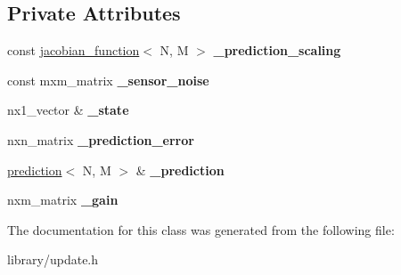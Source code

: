 \subsection*{Private Attributes}
\begin{DoxyCompactItemize}
\item 
\mbox{\label{classkafi_1_1update_a0f6b23c8db93eaabebb57f04261b558b}} 
const \hyperlink{classkafi_1_1jacobian__function}{jacobian\+\_\+function}$<$ N, M $>$ {\bfseries \+\_\+prediction\+\_\+scaling}
\item 
\mbox{\label{classkafi_1_1update_a5f1400abcbc39bbe79da665be423da8d}} 
const mxm\+\_\+matrix {\bfseries \+\_\+sensor\+\_\+noise}
\item 
\mbox{\label{classkafi_1_1update_aa20b763af43462c49c505534e7a2abdf}} 
nx1\+\_\+vector \& {\bfseries \+\_\+state}
\item 
\mbox{\label{classkafi_1_1update_a5e614c901581bb10706cf78fe8ef0e25}} 
nxn\+\_\+matrix {\bfseries \+\_\+prediction\+\_\+error}
\item 
\mbox{\label{classkafi_1_1update_a19ee3abe314c3b92e84efca1658366f1}} 
\hyperlink{classkafi_1_1prediction}{prediction}$<$ N, M $>$ \& {\bfseries \+\_\+prediction}
\item 
\mbox{\label{classkafi_1_1update_a9a9f9566358afc6c9d761dcc4e8b7ac6}} 
nxm\+\_\+matrix {\bfseries \+\_\+gain}
\end{DoxyCompactItemize}


The documentation for this class was generated from the following file\+:\begin{DoxyCompactItemize}
\item 
library/update.\+h\end{DoxyCompactItemize}
